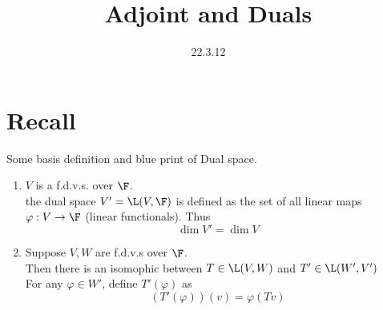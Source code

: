 \documentclass{mathnote}
\title{Adjoint and Duals}
\date{22.3.12}
\begin{document}
    \section*{Recall} Some basis definition and blue print of Dual space.
    \begin{enumerate}
        \item   $V$ is a f.d.v.s. over $\F$.\\
                the dual space $V' = \L(V, \F)$ is defined as the set of all linear maps $\varphi: V\to \F $ (linear functionals).
                Thus
                \[\dim V' = \dim V\]
        \item   Suppose $V,W$ are f.d.v.s over $\F$.\\
                Then there is an isomophic between $T\in \L(V,W) $ and $ T' \in \L(W',V')$\\
                For any $\varphi \in W'$, define $T' (\varphi) $ as
                \[(T'(\varphi))(v) = \varphi (Tv)\]
                

\end{enumerate}
\end{document}
